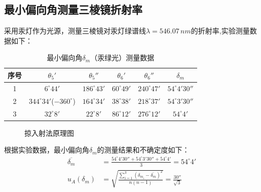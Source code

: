 \documentclass[12pt]{article}
\begin{document}
\subsection{最小偏向角测量三棱镜折射率}
\vspace{0.2cm}
\quad 采用汞灯作为光源，测量三棱镜对汞灯绿谱线$\lambda=546.07\,nm$的折射率,实验测量数据如下：
\begin{table}[H]
    \centering
    \begin{tabular}{cccccc}
        序号 & $\theta_5'$     & $\theta_5''$     & $\theta_6'$      & $\theta_6''$     & $\delta_m $                  \\ \hline
        1  & $6^{\circ}44'$ & $186^{\circ}43'$ & $60^{\circ}49'$ & $240^{\circ}47'$ & $54^{\circ}4'30''$     \\
        2  & $344^{\circ}34'$($-360^{\circ}$) & $164^{\circ}34'$ & $38^{\circ}38'$ & $218^{\circ}37'$ & $54^{\circ}3'30''$     \\
        3  & $32^{\circ}8'$ & $22^{\circ}8'$ & $86^{\circ}12'$ & $276^{\circ}12'$ & $54^{\circ}4'$
        \end{tabular}
    \caption{最小偏向角$\delta_m$（汞绿光）测量数据}
\end{table}
\begin{figure}[H]
    \centering
    \caption{掠入射法原理图}
\end{figure}
根据实验数据，最小偏向角$\delta_m$的测量结果和不确定度如下：\\
\begin{equation*}
    \begin{aligned}
        \overline{\delta_m} &= \frac{54^{\circ}4'30'' + 54^{\circ}3'30'' + 54^{\circ}4'}{3} = 54^{\circ}4' \\
        u_A(\delta_m) &= \sqrt{\frac{\sum_{i=1}^3(\delta_{m_i}-\overline{\delta_m})^2}{n(n-1)}} = \frac{30''}{\sqrt{3}} 
    \end{aligned}
\end{equation*}
\end{document}
